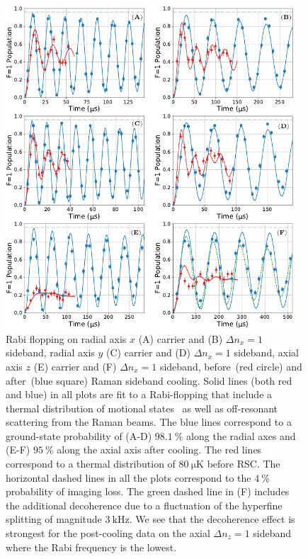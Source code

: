 \begin{figure}
  \includegraphics[width=0.96\textwidth]{figures/na_rsc_rabi_flop.pdf}
  \caption[Rabi flopping on carriers and sidebands]{
    Rabi flopping on radial axis $x$ (A) carrier and (B) $\Delta n_x=1$ sideband,
    radial axis $y$ (C) carrier and (D) $\Delta n_x=1$ sideband,
    axial axis $z$ (E) carrier and (F) $\Delta n_x=1$ sideband,
    before~(red circle) and after~(blue square) Raman sideband cooling.
    Solid lines (both red and blue) in all plots are fit to a Rabi-flopping
    that include a thermal distribution of motional states~\cite{meekhof_generation_1996}
    as well as off-resonant scattering from the Raman beams.
    The blue lines correspond to a ground-state probability of
    (A-D) $98.1~\mathrm{\%}$ along the radial axes
    and (E-F) $95~\mathrm{\%}$ along the axial axis after cooling.
    The red lines correspond to a thermal distribution of $80~\mathrm{\mu K}$ before RSC.
    The horizontal dashed lines in all the plots correspond to the $4~\mathrm{\%}$ probability
    of imaging loss.
    The green dashed line in (F) includes the additional decoherence due to
    a fluctuation of the hyperfine splitting of magnitude $3~\mathrm{kHz}$.
    We see that the decoherence effect is strongest for the post-cooling data on
    the axial $\Delta n_z=1$ sideband where the Rabi frequency is the lowest.
    \label{fig:rsc:na-rabi-flop}}
\end{figure}

